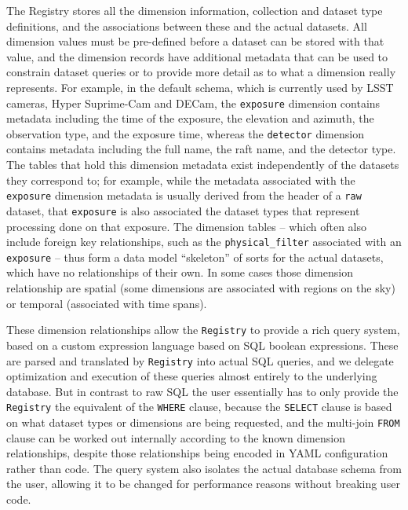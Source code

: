 \documentclass[]{spie}
\begin{document}
The Registry stores all the dimension information, collection and dataset type definitions, and the associations between these and the actual datasets.
All dimension values must be pre-defined before a dataset can be stored with that value, and the dimension records have additional metadata that can be used to constrain dataset queries or to provide more detail as to what a dimension really represents.
For example, in the default schema, which is currently used by LSST cameras, Hyper Suprime-Cam\cite{2018PASJ...70S...1M} and DECam\cite{2015AJ....150..150F}, the \texttt{exposure} dimension contains metadata including the time of the exposure, the elevation and azimuth, the observation type, and the exposure time, whereas the \texttt{detector} dimension contains metadata including the full name, the raft name, and the detector type.
The tables that hold this dimension metadata exist independently of the datasets they correspond to; for example, while the metadata associated with the \texttt{exposure} dimension metadata is usually derived from the header of a \texttt{raw} dataset, that \texttt{exposure} is also associated the dataset types that represent processing done on that exposure.
The dimension tables -- which often also include foreign key relationships, such as the \texttt{physical\_filter} associated with an \texttt{exposure} -- thus form a data model ``skeleton'' of sorts for the actual datasets, which have no relationships of their own.
In some cases those dimension relationship are spatial (some dimensions are associated with regions on the sky) or temporal (associated with time spans).

These dimension relationships allow the \texttt{Registry} to provide a rich query system, based on a custom expression language based on SQL boolean expressions.
These are parsed and translated by \texttt{Registry} into actual SQL queries, and we delegate optimization and execution of these queries almost entirely to the underlying database.
But in contrast to raw SQL the user essentially has to only provide the \texttt{Registry} the equivalent of the \texttt{WHERE} clause, because the \texttt{SELECT} clause is based on what dataset types or dimensions are being requested, and the multi-join \texttt{FROM} clause can be worked out internally according to the known dimension relationships, despite those relationships being encoded in YAML configuration rather than code.
The query system also isolates the actual database schema from the user, allowing it to be changed for performance reasons without breaking user code.
\end{document}
